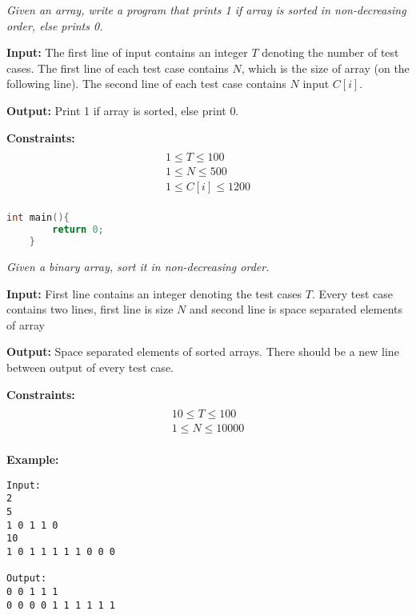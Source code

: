 \begin{problem}
\textit{Given an array, write a program that prints 1 if array is sorted in non-decreasing order, else prints 0.}

\textbf{Input:}
The first line of input contains an integer $T$ denoting the number of test cases.
The first line of each test case contains $N$, which is the size of array (on the following line).
The second line of each test case contains $N$ input $C[i]$.

\textbf{Output:}
Print 1 if array is sorted, else print 0.

\textbf{Constraints:}
\begin{multline}\\
1 \leq T \leq 100\\
1 \leq N \leq 500\\
1 \leq C[i] \leq 1200\\
\end{multline}
\end{problem}

\begin{solution}
\begin{lstlisting}[language=C++, caption="C++ Solution"]
	int main(){
		return 0;	
	}
\end{lstlisting}

\end{solution}



\begin{problem}
\textit{Given a binary array, sort it in non-decreasing order.}

\textbf{Input:}
First line contains an integer denoting the test cases $T$.  Every test case contains two lines, first line is size $N$ and second line is space separated elements of array

\textbf{Output:}
Space separated elements of sorted arrays.  There should be a new line between output of every test case.

\textbf{Constraints:}
\begin{multline}\\
10 \leq T \leq 100\\
1 \leq N \leq 10000\\
\end{multline}

\textbf{Example:}
\begin{verbatim}
Input:
2
5
1 0 1 1 0
10
1 0 1 1 1 1 1 0 0 0

Output:
0 0 1 1 1
0 0 0 0 1 1 1 1 1 1 

\end{verbatim}

\end{problem}

